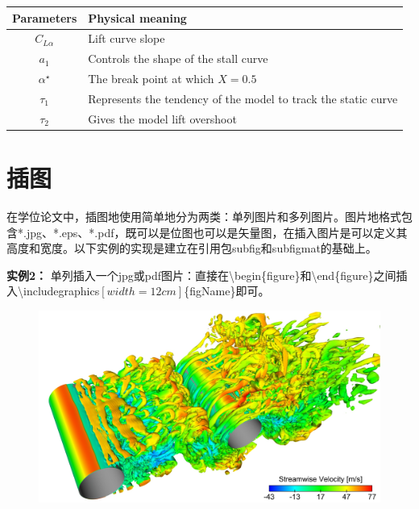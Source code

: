 \begin{table}[htb]               %
\centering
 \begin{center}
  \label{tab:LB-parameters}
  \begin{tabular}{cl}
      \toprule
       Parameters & Physical meaning       \\
      \midrule   %
       $C_{L\alpha}$ & Lift curve slope \\
       $a_{1}$ & Controls the shape of the stall curve \\
       $\alpha^{\star}$ & The break point at which $X=0.5$ \\
       $\tau_{1}$ & Represents the tendency of the model to track the static curve \\
       $\tau_{2}$ & Gives the model lift overshoot \\
      \bottomrule
  \end{tabular}
 \end{center}
\end{table}

\section{插图}
\label{sec:fig}

在学位论文中，插图地使用简单地分为两类：单列图片和多列图片。图片地格式包含*.jpg、*.eps、*.pdf，既可以是位图也可以是矢量图，在插入图片是可以定义其高度和宽度。以下实例的实现是建立在引用包subfig和subfigmat的基础上。

{\bf{实例2：}} 单列插入一个jpg或pdf图片：直接在\textbackslash begin\{figure\}和\textbackslash end\{figure\}之间插入\textbackslash includegraphics$\left[width=12cm\right]$\{figName\}即可。

\begin{figure}[htb]
\centering
   \includegraphics[width=12cm]{./img/visual_jpg}
  \label{fig:visual}
\end{figure}

